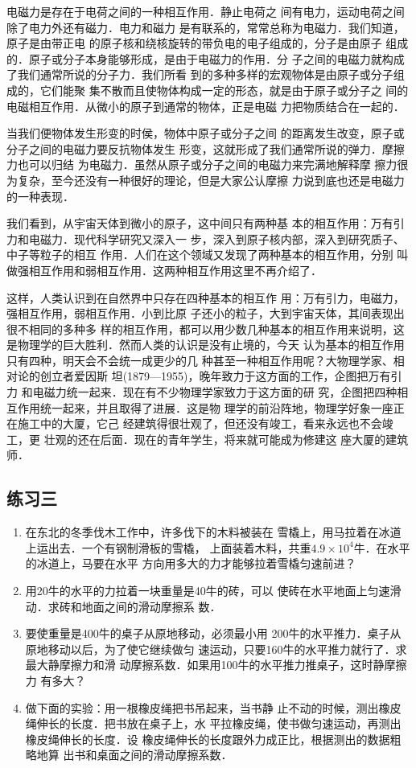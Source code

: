     电磁力是存在于电荷之间的一种相互作用．静止电荷之
间有电力，运动电荷之间除了电力外还有磁力．电力和磁力
是有联系的，常常总称为电磁力．我们知道，原子是由带正电
的原子核和绕核旋转的带负电的电子组成的，分子是由原子
组成的．原子或分子本身能够形成，是由于电磁力的作用．分
子之间的电磁力就构成了我们通常所说的分子力．我们所看
到的多种多样的宏观物体是由原子或分子组成的，它们能聚
集不散而且使物体构成一定的形态，就是由于原子或分子之
间的电磁相互作用．从微小的原子到通常的物体，正是电磁
力把物质结合在一起的．

    当我们便物体发生形变的时侯，物体中原子或分子之间
的距离发生改变，原子或分子之间的电磁力要反抗物体发生
形变，这就形成了我们通常所说的弹力．摩擦力也可以归结
为电磁力．虽然从原子或分子之间的电磁力来完满地解释摩
擦力很为复杂，至今还没有一种很好的理论，但是大家公认摩擦
力说到底也还是电磁力的一种表现．

    我们看到，从宇宙天体到微小的原子，这中间只有两种基
本的相互作用：万有引力和电磁力．现代科学研究又深入一
步，深入到原子核内部，深入到研究质子、中子等粒子的相互
作用．人们在这个领域又发现了两种基本的相互作用，分别
叫做强相互作用和弱相互作用．这两种相互作用这里不再介绍了．

    这样，人类认识到在自然界中只存在四种基本的相互作
用：万有引力，电磁力，强相互作用，弱相互作用．小到比原
子还小的粒子，大到宇宙天体，其间表现出很不相同的多种多
样的相互作用，都可以用少数几种基本的相互作用来说明，这
是物理学的巨大胜利．然而人类的认识是没有止境的，今天
认为基本的相互作用只有四种，明天会不会统一成更少的几
种甚至一种相互作用呢？大物理学家、相对论的创立者爱因斯
坦(1879—1955)，晚年致力于这方面的工作，企图把万有引力
和电磁力统一起来．现在有不少物理学家致力于这方面的研
究，企图把四种相互作用统一起来，并且取得了进展．这是物
理学的前沿阵地，物理学好象一座正在施工中的大厦，它己
经建筑得很壮观了，但还没有竣工，看来永远也不会竣工，更
壮观的还在后面．现在的青年学生，将来就可能成为修建这
座大厦的建筑师．

\subsection*{练习三}
\begin{enumerate}
\item  在东北的冬季伐木工作中，许多伐下的木料被装在
雪橇上，用马拉着在冰道上运出去．一个有钢制滑板的雪橇，
上面装着木料，共重$4.9\times 10^4$牛．在水平的冰道上，马要在水平
方向用多大的力才能够拉着雪橇匀速前进？

\item  用20牛的水平的力拉着一块重量是40牛的砖，可以
使砖在水平地面上匀速滑动．求砖和地面之间的滑动摩擦系
数．
\item  要使重量是400牛的桌子从原地移动，必须最小用
200牛的水平推力．桌子从原地移动以后，为了使它继续做匀
速运动，只要160牛的水平推力就行了．求最大静摩擦力和滑
动摩擦系数．如果用100牛的水平推力推桌子，这时静摩擦力
有多大？

\item  做下面的实验：用一根橡皮绳把书吊起来，当书静
止不动的时候，测出橡皮绳伸长的长度．把书放在桌子上，水
平拉橡皮绳，使书做匀速运动，再测出橡皮绳伸长的长度．设
橡皮绳伸长的长度跟外力成正比，根据测出的数据粗略地算
出书和桌面之间的滑动摩擦系数．
\end{enumerate}


